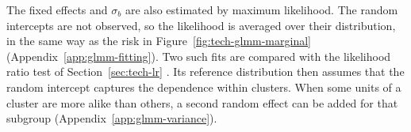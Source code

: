 \label{sec:tech-glmm-likelihood}%
The fixed effects and $\sigma_b$ are also estimated by maximum likelihood. The random intercepts are
not observed, so the likelihood is averaged over their distribution, in the same way as the risk in
Figure~\ref{fig:tech-glmm-marginal} (Appendix~\ref{app:glmm-fitting}). Two such fits are compared with
the likelihood ratio test of Section~\ref{sec:tech-lr} \cite[Section~11.7]{dobson2002glm}. Its
reference distribution then assumes that the random intercept captures the dependence within clusters.
When some units of a cluster are more alike than others, a second random effect can be added for that
subgroup (Appendix~\ref{app:glmm-variance}).
